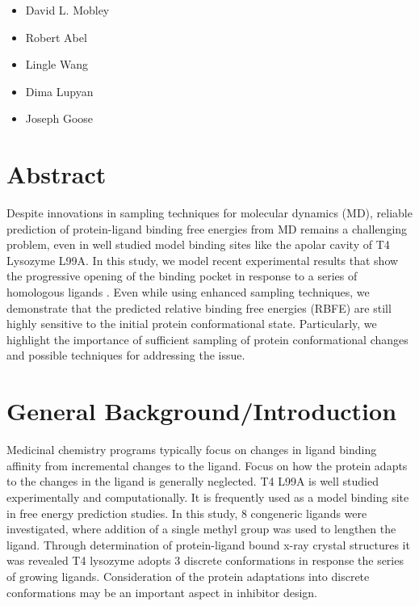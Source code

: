 \documentclass{article}
\begin{document}
\begin{acknowledgement}
\begin{itemize}
   \item David L. Mobley
   \item Robert Abel
   \item Lingle Wang
   \item Dima Lupyan
   \item Joseph Goose
\end{itemize}
\end{acknowledgement}

\pagebreak

\section{Abstract}
Despite innovations in sampling techniques for molecular dynamics (MD), reliable prediction of protein-ligand binding free energies from MD remains a challenging problem, even in well studied model binding sites like the apolar cavity of T4 Lysozyme L99A\cite{Boyce2009}. 
In this study, we model recent experimental results that show the progressive opening of the binding pocket in response to a series of homologous ligands \cite{Merski2015}. 
Even while using enhanced sampling techniques, we demonstrate that the predicted relative binding free energies (RBFE) are still highly sensitive to the initial protein conformational state. 
Particularly, we highlight the importance of sufficient sampling of protein conformational changes and possible techniques for addressing the issue.

\section{General Background/Introduction}
Medicinal chemistry programs typically focus on changes in ligand binding affinity from incremental changes to the ligand.
Focus on how the protein adapts to the changes in the ligand is generally neglected.
T4 L99A is well studied experimentally and computationally. 
It is frequently used as a model binding site in free energy prediction studies.
In this study, 8 congeneric ligands were investigated, where addition of a single methyl group was used to lengthen the ligand.
Through determination of protein-ligand bound x-ray crystal structures it was revealed T4 lysozyme adopts 3 discrete conformations in response the series of growing ligands.
Consideration of the protein adaptations into discrete conformations may be an important aspect in inhibitor design.
\end{document}
